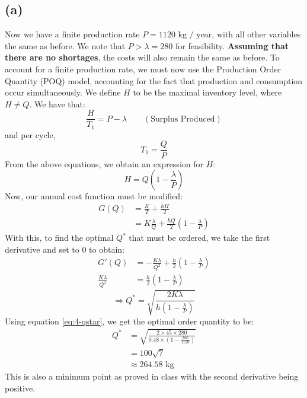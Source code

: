 \documentclass[12pt]{article}
\begin{document}

\subsection*{(a)}   

Now we have a finite production rate $P = 1120 \text{ kg / year}$, with all other variables the same as before. We note that $P > \lambda = 280$ for feasibility. \textbf{Assuming that there are no shortages}, the costs will also remain the same as before. To account for a finite production rate, we must now use the Production Order Quantity (POQ) model, accounting for the fact that production and consumption occur simultaneously. We define $H$ to be the maximal inventory level, where $H \neq Q$. We have that: \begin{equation}
    \frac{H}{T_{1}} = P - \lambda \qquad (\text{Surplus Produced})
\end{equation} and per cycle, \begin{equation}
    T_{1} = \frac{Q}{P}
\end{equation} From the above equations, we obtain an expression for $H$: \begin{equation}\label{eq:4-maxinven}
    H = Q\left( 1- \frac{\lambda}{P} \right)
\end{equation} Now, our annual cost function must be modified: \begin{align*}
    G(Q) &= \frac{K}{T} + \frac{hH}{2} \\ 
    &= K\frac{\lambda}{Q} + \frac{hQ}{2}\left( 1- \frac{\lambda}{P} \right) 
\end{align*} With this, to find the optimal $Q^{*}$ that must be ordered, we take the first derivative and set to 0 to obtain: \begin{align*}
    G'(Q) &= - \frac{K\lambda}{Q^{2}} + \frac{h}{2}\left( 1- \frac{\lambda}{P} \right) \\ 
    \frac{K\lambda}{Q^{2}} &= \frac{h}{2}\left( 1- \frac{\lambda}{P} \right) 
\end{align*} \begin{equation}\label{eq:4-qstar}
    \Longrightarrow Q^{*} = \sqrt{ \frac{2K\lambda}{h\left(  1- \frac{\lambda}{P} \right)}} 
\end{equation} Using equation \ref{eq:4-qstar}, we get the optimal order quantity to be: \begin{align*}
    Q^{*} &= \sqrt{ \frac{2 \times 45 \times 280}{0.48\times \left( 1- \frac{280}{1120} \right)}} \\ 
    &= 100\sqrt{7} \\ 
    &\approx \boxed{264.58 \text{ kg}}
\end{align*} This is also a minimum point as proved in class with the second derivative being positive.
\end{document}
